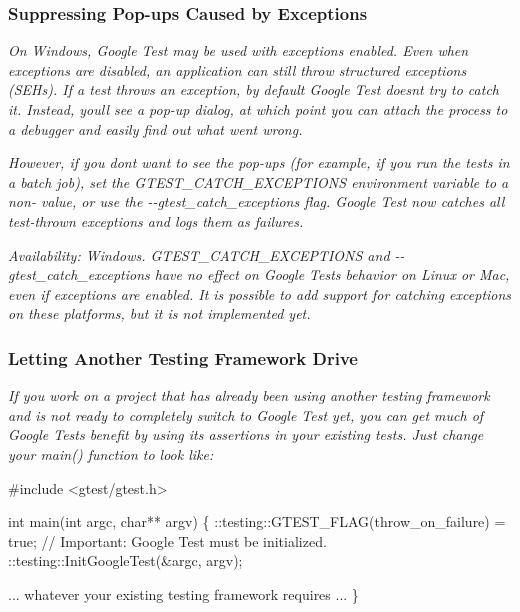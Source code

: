 {\itshape \subsubsection*{Suppressing Pop-\/ups Caused by Exceptions}}

{\itshape }

{\itshape On Windows, Google Test may be used with exceptions enabled. Even when exceptions are disabled, an application can still throw structured exceptions (S\+EH\textquotesingle{}s). If a test throws an exception, by default Google Test doesn\textquotesingle{}t try to catch it. Instead, you\textquotesingle{}ll see a pop-\/up dialog, at which point you can attach the process to a debugger and easily find out what went wrong.}

{\itshape However, if you don\textquotesingle{}t want to see the pop-\/ups (for example, if you run the tests in a batch job), set the {\ttfamily G\+T\+E\+S\+T\+\_\+\+C\+A\+T\+C\+H\+\_\+\+E\+X\+C\+E\+P\+T\+I\+O\+NS} environment variable to a non-\/ {} value, or use the {\ttfamily -\/-\/gtest\+\_\+catch\+\_\+exceptions} flag. Google Test now catches all test-\/thrown exceptions and logs them as failures.}

{\itshape {\itshape Availability\+:} Windows. {\ttfamily G\+T\+E\+S\+T\+\_\+\+C\+A\+T\+C\+H\+\_\+\+E\+X\+C\+E\+P\+T\+I\+O\+NS} and {\ttfamily -\/-\/gtest\+\_\+catch\+\_\+exceptions} have no effect on Google Test\textquotesingle{}s behavior on Linux or Mac, even if exceptions are enabled. It is possible to add support for catching exceptions on these platforms, but it is not implemented yet.}

{\itshape \subsubsection*{Letting Another Testing Framework Drive}}

{\itshape }

{\itshape If you work on a project that has already been using another testing framework and is not ready to completely switch to Google Test yet, you can get much of Google Test\textquotesingle{}s benefit by using its assertions in your existing tests. Just change your {\ttfamily main()} function to look like\+:}

{\itshape 
\begin{DoxyCode}
#include <gtest/gtest.h>

int main(int argc, char** argv) \{
  ::testing::GTEST\_FLAG(throw\_on\_failure) = true;
  // Important: Google Test must be initialized.
  ::testing::InitGoogleTest(&argc, argv);

  ... whatever your existing testing framework requires ...
\}
\end{DoxyCode}
}


